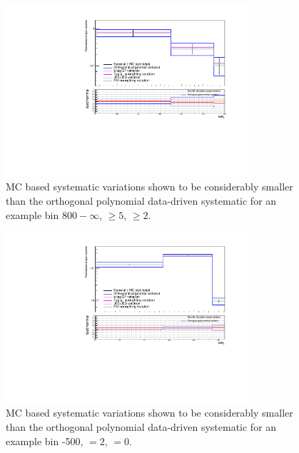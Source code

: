 \begin{figure}[h!]
  \centering
  \includegraphics[width=0.8\textwidth]{figures/template13TeV/mcComparison/totalSMS-T1bbbb_mGluino-1400_mLSP-800_25ns_mht_ge5j_ge3b_800.pdf} 
  \caption{\label{fig:mcCompLow} MC based systematic variations shown to be considerably smaller 
  than the orthogonal polynomial data-driven systematic for an example bin \scalht $800-\infty$, \njet $\geq 5$, \nb $\geq 2$.}
\end{figure}
\begin{figure}[h!]
  \centering
  \includegraphics[width=0.8\textwidth]{figures/template13TeV/mcComparison/totalSMS-T1bbbb_mGluino-1400_mLSP-800_25ns_mht_eq2j_eq0b_400.pdf} 
  \caption{\label{fig:mcCompHigh} MC based systematic variations shown to be considerably smaller 
  than the orthogonal polynomial data-driven systematic for an example bin -500, \njet $= 2$, \nb $= 0$.}
\end{figure}

